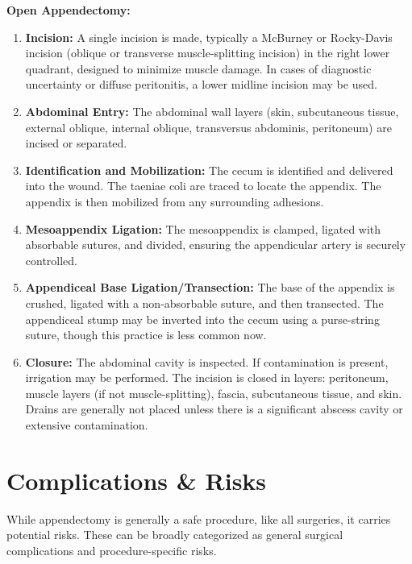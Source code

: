 \textbf{Open Appendectomy:}
\begin{enumerate}
  \item \textbf{Incision:} A single incision is made, typically a McBurney or Rocky-Davis incision (oblique or transverse muscle-splitting incision) in the right lower quadrant, designed to minimize muscle damage. In cases of diagnostic uncertainty or diffuse peritonitis, a lower midline incision may be used.
  \item \textbf{Abdominal Entry:} The abdominal wall layers (skin, subcutaneous tissue, external oblique, internal oblique, transversus abdominis, peritoneum) are incised or separated.
  \item \textbf{Identification and Mobilization:} The cecum is identified and delivered into the wound. The taeniae coli are traced to locate the appendix. The appendix is then mobilized from any surrounding adhesions.
  \item \textbf{Mesoappendix Ligation:} The mesoappendix is clamped, ligated with absorbable sutures, and divided, ensuring the appendicular artery is securely controlled.
  \item \textbf{Appendiceal Base Ligation/Transection:} The base of the appendix is crushed, ligated with a non-absorbable suture, and then transected. The appendiceal stump may be inverted into the cecum using a purse-string suture, though this practice is less common now.
  \item \textbf{Closure:} The abdominal cavity is inspected. If contamination is present, irrigation may be performed. The incision is closed in layers: peritoneum, muscle layers (if not muscle-splitting), fascia, subcutaneous tissue, and skin. Drains are generally not placed unless there is a significant abscess cavity or extensive contamination.
\end{enumerate}

\section*{Complications \& Risks}
While appendectomy is generally a safe procedure, like all surgeries, it carries potential risks. These can be broadly categorized as general surgical complications and procedure-specific risks.

